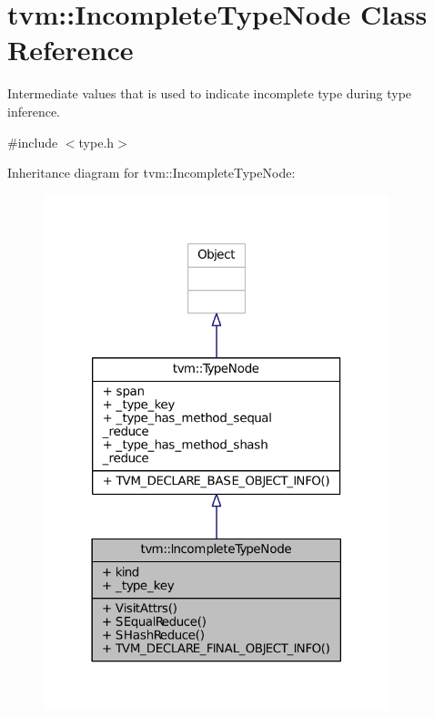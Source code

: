 \hypertarget{classtvm_1_1IncompleteTypeNode}{}\section{tvm\+:\+:Incomplete\+Type\+Node Class Reference}
\label{classtvm_1_1IncompleteTypeNode}


Intermediate values that is used to indicate incomplete type during type inference.  




{\ttfamily \#include $<$type.\+h$>$}



Inheritance diagram for tvm\+:\+:Incomplete\+Type\+Node\+:
\nopagebreak
\begin{figure}[H]
\begin{center}
\leavevmode
\includegraphics[width=285pt]{classtvm_1_1IncompleteTypeNode__inherit__graph}
\end{center}
\end{figure}


